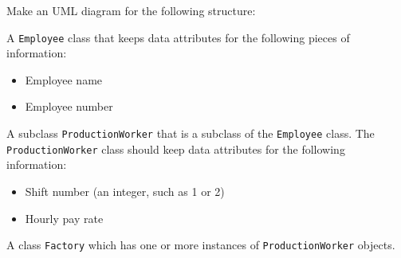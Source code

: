 Make an UML diagram for the following structure:

A \texttt{Employee} class that keeps data attributes for the following pieces of information: 
\begin{itemize}
\item Employee name
\item Employee number
\end{itemize}

A subclass \texttt{ProductionWorker} that is a subclass of the \texttt{Employee} class. The \texttt{ProductionWorker} class should keep data attributes for the following information:
\begin{itemize}
\item Shift number (an integer, such as 1 or 2)
\item Hourly pay rate
\end{itemize}

A class \texttt{Factory} which has one or more instances of \texttt{ProductionWorker} objects.
